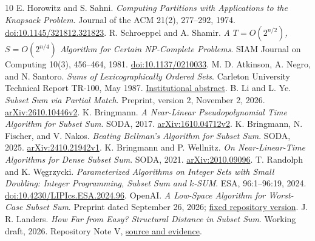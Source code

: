 \documentclass[10pt]{article}
\begin{document}
\begin{thebibliography}{10}
\small
\setlength{\itemsep}{2pt}
\setlength{\parskip}{0pt}
 E. Horowitz and S. Sahni.
\emph{Computing Partitions with Applications to the Knapsack Problem}.
Journal of the ACM 21(2), 277--292, 1974.
\href{https://doi.org/10.1145/321812.321823}{doi:10.1145/321812.321823}.
 R. Schroeppel and A. Shamir.
\emph{A $T=O(2^{n/2})$, $S=O(2^{n/4})$ Algorithm for Certain NP-Complete Problems}.
SIAM Journal on Computing 10(3), 456--464, 1981.
\href{https://doi.org/10.1137/0210033}{doi:10.1137/0210033}.
 M. D. Atkinson, A. Negro, and N. Santoro.
\emph{Sums of Lexicographically Ordered Sets}.
Carleton University Technical Report TR-100, May 1987.
\href{https://carleton.ca/scs/research/scs-technical-reports/technical-reports-1987/tr-100-sums-of-lexicographically-ordered-sets/}{Institutional abstract}.
 B. Li and L. Ye.
\emph{Subset Sum via Partial Match}.
Preprint, version 2, November 2, 2026.
\href{https://arxiv.org/abs/2610.10446v2}{arXiv:2610.10446v2}.
 K. Bringmann.
\emph{A Near-Linear Pseudopolynomial Time Algorithm for Subset Sum}.
SODA, 2017.
\href{https://arxiv.org/abs/1610.04712v2}{arXiv:1610.04712v2}.
 K. Bringmann, N. Fischer, and V. Nakos.
\emph{Beating Bellman's Algorithm for Subset Sum}.
SODA, 2025.
\href{https://arxiv.org/abs/2410.21942v1}{arXiv:2410.21942v1}.
 K. Bringmann and P. Wellnitz.
\emph{On Near-Linear-Time Algorithms for Dense Subset Sum}.
SODA, 2021.
\href{https://arxiv.org/abs/2010.09096}{arXiv:2010.09096}.
 T. Randolph and K. W\k{e}grzycki.
\emph{Parameterized Algorithms on Integer Sets with Small Doubling:
Integer Programming, Subset Sum and $k$-SUM}.
ESA, 96:1--96:19, 2024.
\href{https://doi.org/10.4230/LIPIcs.ESA.2024.96}{doi:10.4230/LIPIcs.ESA.2024.96}.
 OpenAI.
\emph{A Low-Space Algorithm for Worst-Case Subset Sum}.
Preprint dated September 26, 2026;
\href{https://github.com/openai/math/blob/7ef5c0cc5ca4b0e072b7a050fca09ab24bc6fa3a/preprints/A-Low-Space-Algorithm-for-Worst-Case-Subset-Sum-September-26-2026/paper.pdf}{fixed repository version}.
 J. R. Landers.
\emph{How Far from Easy? Structural Distance in Subset Sum}.
Working draft, 2026. Repository Note V,
\href{https://github.com/jonland82/exponential-search-spaces/tree/master/notes/05-structural-distance}{source and evidence}.
\end{thebibliography}
\end{document}
